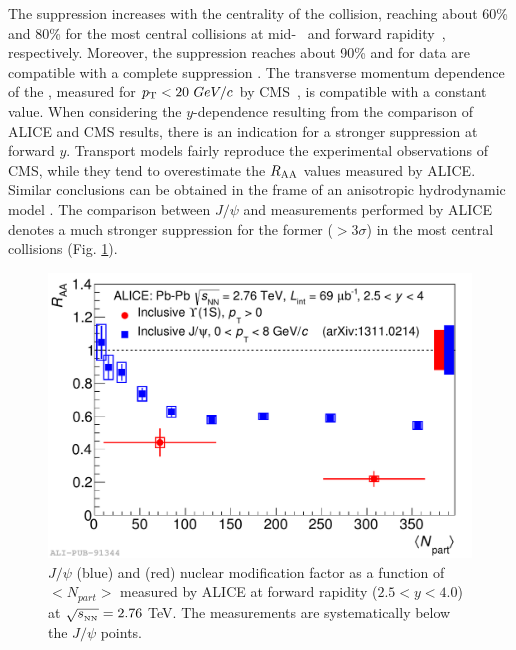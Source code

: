 The suppression increases with the centrality of the collision, reaching about 60\% and 80\% for the most central collisions at mid-~\cite{Khachatryan:2016xxp} and forward rapidity~\cite{Abelev:2014nua}, respectively. 
Moreover, the \upsiss suppression reaches about 90\% and for \upsisss data are compatible with a complete suppression \cite{Khachatryan:2016xxp}. 
The transverse momentum dependence of the \upsis \raa, measured for $p_{\rm T}<20\ GeV/c$ by CMS~\cite{Khachatryan:2016xxp}, is compatible with a constant value. 
When considering the $y$-dependence resulting from the comparison of ALICE and CMS results, there is an indication for a stronger suppression at forward $y$.
Transport models \cite{Zhou:2014kka,Du:2017qkv} fairly reproduce the experimental observations of CMS, while they tend to overestimate the $R_{\rm AA}$ values measured by ALICE. 
Similar conclusions can be obtained in the frame of an anisotropic hydrodynamic model \cite{Krouppa:2017jlg}. 
The comparison between $J/\psi$ and \upsis measurements performed by ALICE denotes a much stronger suppression for the former ($>3\sigma$) in the most central collisions (Fig. \ref{fig:ALICE_jpsi_upsi}).

\begin{figure}[!t]
\begin{center}
\includegraphics[width=0.8\linewidth]{Chapters/Analysis/Figs/2014-Dec-16-Raa_Jpsi_centr.pdf}
\caption{$J/\psi$ (blue) and \upsis (red) nuclear modification factor as a function of $<N_{part}>$ measured by ALICE at forward rapidity ($2.5<y<4.0$) at $\sqrt{s_{_{\rm NN}}}=2.76$ \rm{TeV}. The \upsis measurements are systematically below the $J/\psi$ points.}
\label{fig:ALICE_jpsi_upsi}
\end{center}
\end{figure}

